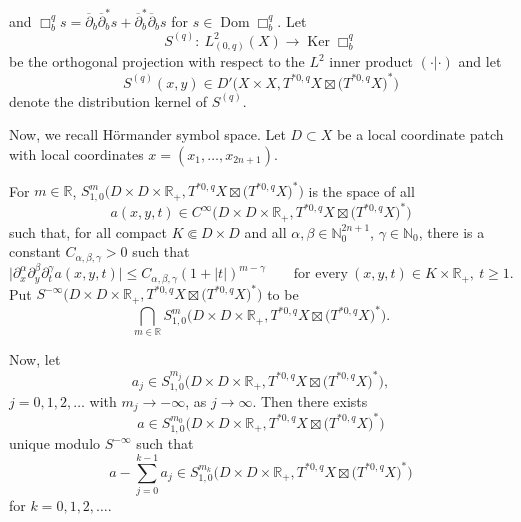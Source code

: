 \documentclass[10pt,a4paper]{amsart}
\numberwithin{equation}{section}
\newcommand{\Real}{\mathbb R}
\newcommand{\ddbar}{\overline\partial}
\newcommand{\pr}{\partial}
\newcommand{\ol}{\overline}
\newcommand{\abs}[1]{\left\vert#1\right\vert}
\newcommand{\To}{\rightarrow}
\begin{document}
	 and
$
	 		\Box^{q}_{b}s=\ddbar_{b}\ol{\pr}^{*}_{b}s+\ol{\pr}^{*}_{b}\ddbar_{b}s
 $ for $s\in \operatorname{Dom}\Box^q_{b} $.
	 Let
	 \[%
	 	S^{(q)}\colon\ L^2_{(0,q)}(X)\To\operatorname{Ker}\Box^q_b
	 \]
	 be the orthogonal projection with respect to the $L^2$ inner product $( \cdot | \cdot )$ and let
	 \[
	 S^{(q)}(x,y)\in{D}'\bigl(X\times X,T^{*0,q}X\boxtimes\bigl(T^{*0,q}X\bigr)^*\bigr)
	 \]
	 denote the distribution kernel of $S^{(q)}$.
	
	 Now, we recall H\"ormander symbol space. Let $D\subset X$ be a local coordinate patch with local coordinates $x=(x_1,\dots,x_{2n+1})$.
	
	 \begin{Definition}\label{d-gue140221a}
	 	For $m\in\Real$,
$
S^m_{1,0}\bigl(D\times D\times\mathbb{R}_+,T^{*0,q}X\boxtimes\bigl(T^{*0,q}X\bigr)^*\bigr)
$
	 	is the space of all
\[
a(x,y,t)\in{C}^\infty\bigl(D\times D\times\mathbb{R}_+,T^{*0,q}X\boxtimes\bigl(T^{*0,q}X\bigr)^*\bigr)
\]
	 	such that, for all compact $K\Subset D\times D$ and all $\alpha, \beta\in\mathbb N^{2n+1}_0$, $\gamma\in\mathbb N_0$,
	 	there is a constant $C_{\alpha,\beta,\gamma}>0$ such that
	 	\[\big|\pr^\alpha_x\pr^\beta_y\pr^\gamma_t a(x,y,t)\big|\leq C_{\alpha,\beta,\gamma}(1+\abs{t})^{m-\gamma} \qquad
	 	\text{for every}\ (x,y,t)\in K\times\Real_+, \ t\geq1.\]
	 	Put
$S^{-\infty}\bigl(D\times D\times\mathbb{R}_+,T^{*0,q}X\boxtimes\bigl(T^{*0,q}X\bigr)^*\bigr)$
	 	to be
	 	\[\bigcap_{m\in\Real}S^m_{1,0}\bigl(D\times D\times\mathbb{R}_+,T^{*0,q}X\boxtimes\bigl(T^{*0,q}X\bigr)^*\bigr).
	 	\]
	 	
	 	Now, let \[a_j\in S^{m_j}_{1,0}\bigl(D\times D\times\mathbb{R}_+,T^{*0,q}X\boxtimes\bigl(T^{*0,q}X\bigr)^*\bigr) ,\]
	 	$j=0,1,2,\dots$ with $m_j\To-\infty$, as $j\To\infty$.
	 	Then there exists \[a\in S^{m_0}_{1,0}\bigl(D\times D\times\mathbb{R}_+,T^{*0,q}X\boxtimes\bigl(T^{*0,q}X\bigr)^*\bigr)\]
	 	unique modulo $S^{-\infty}$ such that
	 	\[a-\sum^{k-1}_{j=0}a_j\in S^{m_k}_{1,0}\bigl(D\times D\times\mathbb{R}_+,T^{*0,q}X\boxtimes\bigl(T^{*0,q}X\bigr)^*\bigr)\]
	 	for $k=0,1,2,\dots$.
	 	

\end{Definition}
\end{document}

